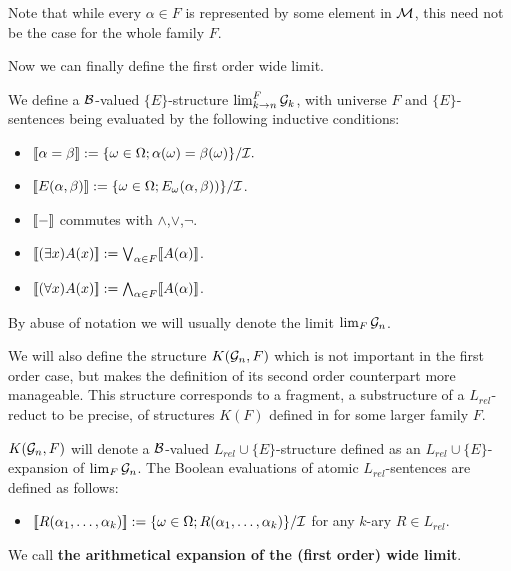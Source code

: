 Note that while every $\alpha\in F$ is represented by some element in $\mathcal{M}$, this need not be the case for the whole family $F$. 



Now we can finally define the first order wide limit.

\begin{defi}
We define a $\mathcal{B}$-valued $\{E\}$-structure $\lim_{k\to n}^{F}\mathcal{G}_k$, with universe $F$ and $\{E\}$-sentences being evaluated by the following inductive conditions:
\begin{itemize}
\item $[\![ \alpha=\beta ]\!] := \{\omega\in\Omega; \alpha(\omega)=\beta(\omega)\}/\mathcal{I}.$
\item $[\![ E(\alpha,\beta) ]\!] := \{\omega\in\Omega; E_\omega(\alpha,\beta))\}/\mathcal{I}$.
\item $[\![-]\!]$ commutes with $\land$,$\lor$,$\lnot$.
\item $[\![(\exists x)A(x)]\!]:=\bigvee_{\alpha\in F}[\![ A(\alpha)]\!]$.
\item $[\![(\forall x)A(x)]\!]:=\bigwedge_{\alpha\in F}[\![ A(\alpha)]\!]$.
\end{itemize}

By abuse of notation we will usually denote the limit $\lim_{F}\mathcal{G}_n$.
\end{defi}

We will also define the structure $K(\mathcal{G}_n,F)$ which is not important in the first order case, but makes the definition of its second order counterpart more manageable. This structure corresponds to a fragment, a substructure of a $L_{rel}$-reduct to be precise, of structures $K(F)$ defined in \cite{krajicek2010forcing} for some larger family $F$.


\begin{defi}
$K(\mathcal{G}_n,F)$ will denote a $\mathcal{B}$-valued $L_{rel}\cup\{E\}$-structure defined as an $L_{rel}\cup\{E\}$-expansion of $\lim_F\mathcal{G}_n$. The Boolean evaluations of atomic $L_{rel}$-sentences are defined as follows:

\begin{itemize}
\item $[\![ R(\alpha_1,\dots,\alpha_k) ]\!] := \{\omega\in\Omega; R(\alpha_1,\dots,\alpha_k)\}/\mathcal{I}$ for any $k$-ary $R\in L_{rel}$.
\end{itemize}

We call \textbf{the arithmetical expansion of the (first order) wide limit}.
\end{defi}


